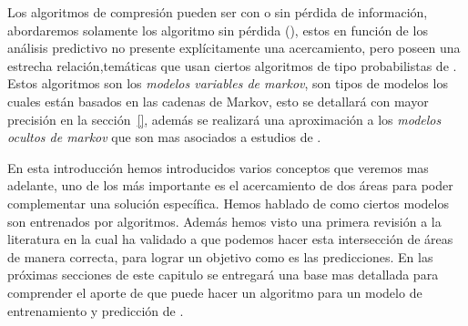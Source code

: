 Los algoritmos de compresión pueden ser con o sin pérdida de información, abordaremos solamente los algoritmo sin pérdida (\losslessdatacompression), estos en función de los análisis predictivo no presente explícitamente una acercamiento, pero poseen una estrecha relación,temáticas que usan ciertos algoritmos de tipo probabilistas de \machinelearning. Estos algoritmos son los \emph{modelos variables de markov}, son tipos de modelos los cuales están basados en las cadenas de Markov, esto se detallará con mayor precisión en la sección~\ref{}, además se realizará una aproximación a los \emph{modelos ocultos de markov} que son mas asociados a estudios de \machinelearning.






En esta introducción hemos introducidos varios conceptos que veremos mas adelante, uno de los más importante es el acercamiento de dos áreas para poder complementar una solución específica. Hemos hablado de como ciertos modelos son entrenados por algoritmos. Además hemos visto una primera revisión a la literatura en la cual ha validado a que podemos hacer esta intersección de áreas de manera correcta, para lograr un objetivo como es las predicciones. En las próximas secciones de este capitulo se entregará una base mas detallada para comprender el aporte de que puede hacer un algoritmo \losslessdatacompression para un modelo de entrenamiento y predicción de \machinelearning.





